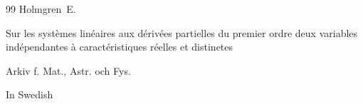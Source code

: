 \begin{thebibliography}{99}
\by Holmgren~E.

\paper Sur les syst\`emes lin\'eaires aux d\'eriv\'ees partielles du premier ordre deux variables ind\'ependantes \`a caract\'eristiques r\'eelles et distinetes

\jour Arkiv f. Mat., Astr. och Fys.




\lang In Swedish





\end{thebibliography}







%

